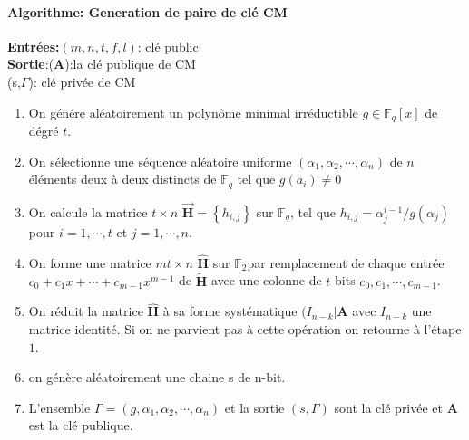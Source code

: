 \documentclass[12pt,openany]{report}
\begin{document}
\paragraph{Algorithme: Generation de paire de  clé CM\\}
\textbf{Entrées:}$(m,n,t,\mathit{f},\mathit{l})$: clé public\\
\textbf{Sortie}:($\mathbf{A}$):la clé publique de CM\\
\hspace{2cm}(s,$\Gamma$): clé privée de CM\\
\begin{enumerate}
\item On génére aléatoirement un polynôme minimal irréductible $g \in \mathbb{F}_q[x]$ de dégré $t$.
\item On sélectionne  une séquence aléatoire uniforme $(\alpha_1,\alpha_2,\cdots,\alpha_n)$ de $n$  éléments deux à deux  distincts de $\mathbb{F}_q$ tel que $g(a_i)\neq 0$
\item On calcule la matrice $t\times n$ $\vec{\mathbf{H}}=\left\lbrace h_{i,j}\right\rbrace $ sur $\mathbb{F}_q$, tel que $h_{i,j}=\alpha^{i-1}_j/g(\alpha_j)$ pour $i=1,\cdots,t$ et $j=1,\cdots,n$.
\item On forme une matrice $mt\times n$ $\hat{\mathbf{H}}$ sur $\mathbb{F}_2$par remplacement de chaque entrée $c_0+c_1x+\cdots+c_{m-1}x^{m-1}$ de $\tilde{\mathbf{H}}$ avec une colonne de $t$ bits $c_0,c_1,\cdots,c_{m-1}$.
\item On réduit la matrice $\hat{\mathbf{H}}$ à sa forme systématique $(\mathit{I}_{n-k}| \mathbf{A}$ avec $\mathit{I}_{n-k}$ une matrice identité. Si on ne parvient pas à cette opération on retourne à l'étape $1$.
\item on génère aléatoirement une chaine s de n-bit.
\item L'ensemble $\Gamma=(g,\alpha_1,\alpha_2,\cdots,\alpha_n)$ et la sortie $(s,\Gamma)$ sont la clé privée et \textbf{A} est la clé publique.
\end{enumerate}
\noindent\hrulefill
{}
\end{document}
